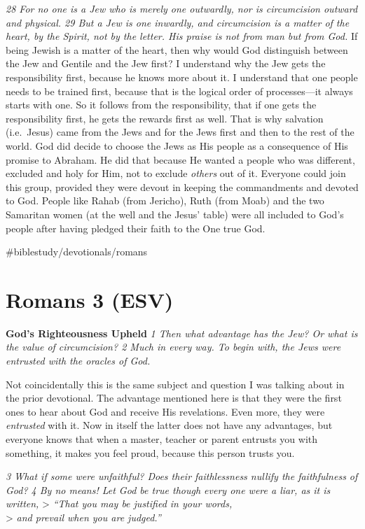 \emph{28 For no one is a Jew who is merely one outwardly, nor is
circumcision outward and physical. 29 But a Jew is one inwardly, and
circumcision is a matter of the heart, by the Spirit, not by the letter.
His praise is not from man but from God.} If being Jewish is a matter of
the heart, then why would God distinguish between the Jew and Gentile
and the Jew first? I understand why the Jew gets the responsibility
first, because he knows more about it. I understand that one people
needs to be trained first, because that is the logical order of
processes---it always starts with one. So it follows from the
responsibility, that if one gets the responsibility first, he gets the
rewards first as well. That is why salvation (i.e.~Jesus) came from the
Jews and for the Jews first and then to the rest of the world. God did
decide to choose the Jews as His people as a consequence of His promise
to Abraham. He did that because He wanted a people who was different,
excluded and holy for Him, not to exclude \emph{others} out of it.
Everyone could join this group, provided they were devout in keeping the
commandments and devoted to God. People like Rahab (from Jericho), Ruth
(from Moab) and the two Samaritan women (at the well and the Jesus'
table) were all included to God's people after having pledged their
faith to the One true God.

\#biblestudy/devotionals/romans

\hypertarget{romans-3-esv}{%
\section{Romans 3 (ESV)}\label{romans-3-esv}}

\textbf{God's Righteousness Upheld} \emph{1 Then what advantage has the
Jew? Or what is the value of circumcision? 2 Much in every way. To begin
with, the Jews were entrusted with the oracles of God.}

Not coincidentally this is the same subject and question I was talking
about in the prior devotional. The advantage mentioned here is that they
were the first ones to hear about God and receive His revelations. Even
more, they were \emph{entrusted} with it. Now in itself the latter does
not have any advantages, but everyone knows that when a master, teacher
or parent entrusts you with something, it makes you feel proud, because
this person trusts you.

\emph{3 What if some were unfaithful? Does their faithlessness nullify
the faithfulness of God? 4 By no means! Let God be true though every one
were a liar, as it is written,} \textgreater{} \emph{``That you may be
justified in your words,}\\
\textgreater{} \emph{and prevail when you are judged.''}

